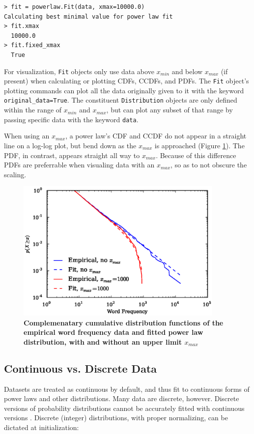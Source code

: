 \documentclass[10pt]{article}
\begin{document}
\begin{verbatim}
> fit = powerlaw.Fit(data, xmax=10000.0)
Calculating best minimal value for power law fit
> fit.xmax
  10000.0
> fit.fixed_xmax
  True
\end{verbatim}

For visualization, \verb"Fit" objects only use data above $x_{min}$ and below $x_{max}$ (if present) when calculating or plotting CDFs, CCDFs, and PDFs. The \verb$Fit$ object's plotting commands can plot all the data originally given to it with the keyword \verb$original_data=True$. The constituent \verb$Distribution$ objects are only defined within the range of $x_{min}$ and $x_{max}$, but can plot any subset of that range by passing specific data with the keyword \verb$data$. 

When using an $x_{max}$, a power law's CDF and CCDF do not appear in a straight line on a log-log plot, but bend down as the $x_{max}$ is approached (Figure \ref{CCDFmax}). The PDF, in contrast, appears straight all way to $x_{max}$. Because of this difference PDFs are preferrable when visualing data with an $x_{max}$, so as to not obscure the scaling.

\begin{figure}[!ht]
\begin{center}
\includegraphics[width=4in]{FigCCDFmax.eps}
\end{center}
\caption{
{\bf Complemenatary cumulative distribution functions of the empirical word frequency data and fitted power law distribution, with and without an upper limit $x_{max}$}
}
\label{CCDFmax}
\end{figure}


\subsection*{Continuous vs. Discrete Data}
Datasets are treated as continuous by default, and thus fit to continuous forms of power laws and other distributions. Many data are discrete, however. Discrete versions of probability distributions cannot be accurately fitted with continuous versions \cite{Clauset2009}. Discrete (integer) distributions, with proper normalizing, can be dictated at initialization:
\end{document}
